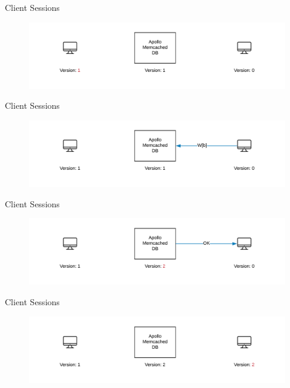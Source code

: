 \documentclass[10pt]{beamer}
\begin{document}
\begin{frame}[fragile]{Client Sessions}
    \begin{figure}
        \includegraphics[scale=0.17]{apollo_client_sessions_3}
    \end{figure}
\end{frame}

\begin{frame}[fragile]{Client Sessions}
    \begin{figure}
        \includegraphics[scale=0.17]{apollo_client_sessions_4}
    \end{figure}
\end{frame}

\begin{frame}[fragile]{Client Sessions}
    \begin{figure}
        \includegraphics[scale=0.17]{apollo_client_sessions_6}
    \end{figure}
\end{frame}

\begin{frame}[fragile]{Client Sessions}
    \begin{figure}
        \includegraphics[scale=0.17]{apollo_client_sessions_7}
    \end{figure}
\end{frame}
\end{document}
